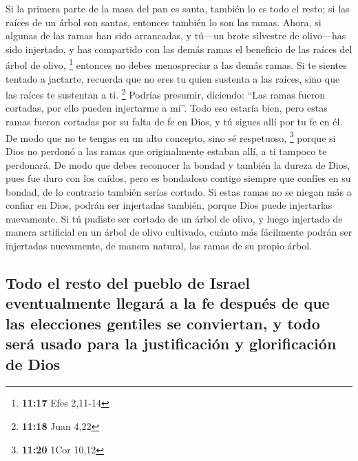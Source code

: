  Si la primera parte de la masa del pan es santa, también
lo es todo el resto; si las raíces de un árbol son santas, entonces
también lo son las ramas.  Ahora, si algunas de las ramas
han sido arrancadas, y tú---un brote silvestre de olivo---has sido
injertado, y has compartido con las demás ramas el beneficio de las
raíces del árbol de olivo, \footnote{\textbf{11:17} Efes 2,11-14}
 entonces no debes menospreciar a las demás ramas. Si te
sientes tentado a jactarte, recuerda que no eres tu quien sustenta a las
raíces, sino que las raíces te sustentan a ti. \footnote{\textbf{11:18}
  Juan 4,22}  Podrías presumir, diciendo: ``Las ramas
fueron cortadas, por ello pueden injertarme a mí''.  Todo
eso estaría bien, pero estas ramas fueron cortadas por su falta de fe en
Dios, y tú sigues allí por tu fe en él. De modo que no te tengas en un
alto concepto, sino sé respetuoso, \footnote{\textbf{11:20} 1Cor 10,12}
 porque si Dios no perdonó a las ramas que originalmente
estaban allí, a ti tampoco te perdonará.  De modo que
debes reconocer la bondad y también la dureza de Dios, pues fue duro con
los caídos, pero es bondadoso contigo siempre que confíes en su bondad,
de lo contrario también serías cortado.  Si estas ramas
no se niegan más a confiar en Dios, podrán ser injertadas también,
porque Dios puede injertarlas nuevamente.  Si tú pudiste
ser cortado de un árbol de olivo, y luego injertado de manera artificial
en un árbol de olivo cultivado, cuánto más fácilmente podrán ser
injertadas nuevamente, de manera natural, las ramas de su propio árbol.

\hypertarget{todo-el-resto-del-pueblo-de-israel-eventualmente-llegaruxe1-a-la-fe-despuuxe9s-de-que-las-elecciones-gentiles-se-conviertan-y-todo-seruxe1-usado-para-la-justificaciuxf3n-y-glorificaciuxf3n-de-dios}{%
\subsection{Todo el resto del pueblo de Israel eventualmente llegará a
la fe después de que las elecciones gentiles se conviertan, y todo será
usado para la justificación y glorificación de
Dios}\label{todo-el-resto-del-pueblo-de-israel-eventualmente-llegaruxe1-a-la-fe-despuuxe9s-de-que-las-elecciones-gentiles-se-conviertan-y-todo-seruxe1-usado-para-la-justificaciuxf3n-y-glorificaciuxf3n-de-dios}}

